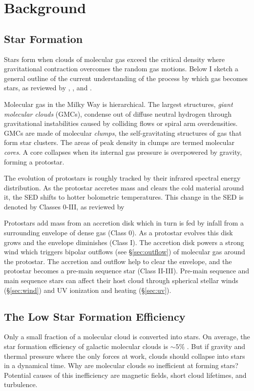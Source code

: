 \section{Background}\label{sec:bkgrd}

\subsection{Star Formation}\label{sec:sf}
Stars form when clouds of molecular gas exceed the critical density where gravitational contraction overcomes the random gas motions. Below I sketch a general outline of the current understanding of the process by which gas becomes stars, as reviewed by \cite{McKee_2007}, \cite{Draine11}, and \cite{Dunham_2014}. 

Molecular gas in the Milky Way is hierarchical. The largest structures, \textit{giant molecular clouds} (GMCs), condense out of diffuse neutral hydrogen through gravitational instabilities caused by colliding flows or spiral arm overdensities. GMCs are made of molecular \textit{clumps}, the self-gravitating structures of gas that form star clusters. The areas of peak density in clumps are termed molecular \textit{cores}. A core collapses when its internal gas pressure is overpowered by gravity, forming a protostar.

The evolution of protostars is roughly tracked by their infrared spectral energy distribution. As the protostar accretes mass and clears the cold material around it, the SED shifts to hotter bolometric temperatures. This change in the SED is denoted by Classes 0-III, as reviewed by \cite{Andre00}

Protostars add mass from an accretion disk which in turn is fed by infall from a surrounding envelope of dense gas (Class 0). As a protostar evolves this disk grows and the envelope diminishes (Class I). The accretion disk powers a strong wind which triggers bipolar outflows (see \S\ref{sec:outflow}) of molecular gas around the protostar. The accretion and outflow help to clear the envelope, and the protostar becomes a pre-main sequence star (Class II-III). Pre-main sequence and main sequence stars can affect their host cloud through spherical stellar winds (\S\ref{sec:wind}) and UV ionization and heating (\S\ref{sec:uv}).

\subsection{The Low Star Formation Efficiency}\label{sec:sfe}
Only a small fraction of a molecular cloud is converted into stars. On average, the star formation efficiency of galactic molecular clouds is $\sim 5\%$ \cite{McKee_2007}. But if gravity and thermal pressure where the only forces at work, clouds should collapse into stars in a dynamical time. Why are molecular clouds so inefficient at forming stars? Potential causes of this inefficiency are magnetic fields, short cloud lifetimes, and turbulence. 

